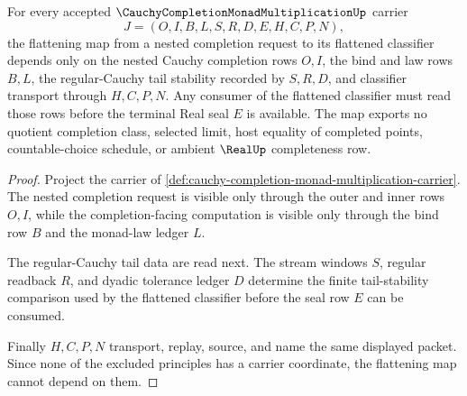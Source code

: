 \begin{theorem}
\label{thm:cauchy-completion-monad-multiplication-flatten-scope}
For every accepted $\CauchyCompletionMonadMultiplicationUp$ carrier
$$
J=(O,I,B,L,S,R,D,E,H,C,P,N),
$$
the flattening map from a nested completion request to its flattened classifier depends only on the nested Cauchy completion rows $O,I$, the bind and law rows $B,L$, the regular-Cauchy tail stability recorded by $S,R,D$, and classifier transport through $H,C,P,N$. Any consumer of the flattened classifier must read those rows before the terminal Real seal $E$ is available. The map exports no quotient completion class, selected limit, host equality of completed points, countable-choice schedule, or ambient $\RealUp$ completeness row.
\end{theorem}
\begin{proof}
Project the carrier of \autoref{def:cauchy-completion-monad-multiplication-carrier}. The nested completion request is visible only through the outer and inner rows $O,I$, while the completion-facing computation is visible only through the bind row $B$ and the monad-law ledger $L$.

The regular-Cauchy tail data are read next. The stream windows $S$, regular readback $R$, and dyadic tolerance ledger $D$ determine the finite tail-stability comparison used by the flattened classifier before the seal row $E$ can be consumed.

Finally $H,C,P,N$ transport, replay, source, and name the same displayed packet. Since none of the excluded principles has a carrier coordinate, the flattening map cannot depend on them.
\end{proof}

